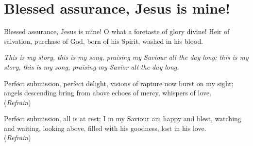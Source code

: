 \starttocol
\chapter{Blessed assurance, Jesus is mine!}
\nexttocol
\hfill{\it }
\stoptocol
\starttocol
\startlines
{\sc Blessed} assurance, Jesus is mine! 
	O what a foretaste of glory divine! 
	Heir of salvation, purchase of God, 
	born of his Spirit, washed in his blood. 

{\it	This is my story, this is my song, 
	praising my Saviour all the day long; 
	this is my story, this is my song, 
	praising my Savior all the day long. }

	Perfect submission, perfect delight, 
	visions of rapture now burst on my sight; 
	angels descending bring from above 
	echoes of mercy, whispers of love. 
\hfill({\it Refrain})~~~~~~~~~

	Perfect submission, all is at rest; 
	I in my Saviour am happy and blest, 
	watching and waiting, looking above, 
	filled with his goodness, lost in his love. 
\hfill({\it Refrain})~~~~~~~~~

\stoplines
\nexttocol

\stoptocol
